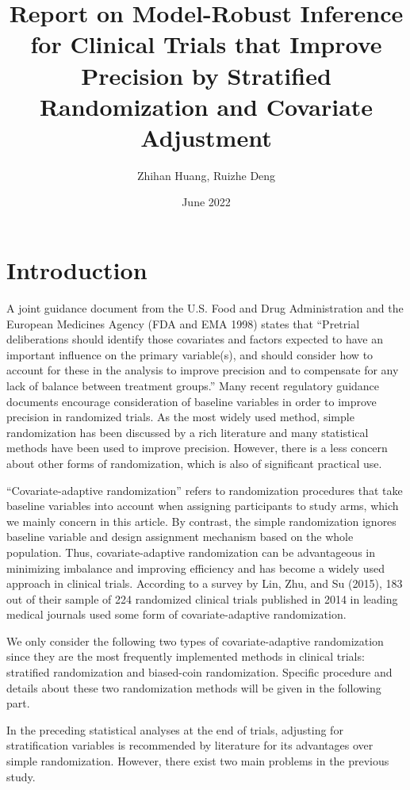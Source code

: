 \documentclass{article}
\title{Report on Model-Robust Inference for Clinical Trials that Improve Precision by Stratified Randomization and Covariate Adjustment}
\author{Zhihan Huang, Ruizhe Deng}
\date{June 2022}
\begin{document}
\maketitle

\section{Introduction}
A joint guidance document from the U.S. Food and Drug
Administration and the European Medicines Agency (FDA and
EMA 1998\cite{fda1998e9}) states that “Pretrial deliberations should identify those covariates and factors expected to have an important influence on the primary variable(s), and should consider how to account for these in the analysis to improve precision and to compensate for any lack of balance between treatment groups.” 
Many recent regulatory guidance documents encourage consideration of baseline variables in order to improve precision in randomized trials. 
As the most widely used method, simple randomization has been discussed by a rich literature and many statistical methods have been used to improve precision. However, there is a less concern about other forms of randomization, which is also of significant practical use.

“Covariate-adaptive randomization” refers to randomization
procedures that take baseline variables into account when
assigning participants to study arms, which we mainly concern in this article. By contrast, the simple randomization ignores baseline variable and design assignment mechanism based on the whole population.
Thus, covariate-adaptive randomization can be advantageous in minimizing imbalance and improving efficiency and has become a widely used approach in clinical trials.
According to a survey by Lin, Zhu, and Su (2015)\cite{lin2015pursuit}, 183 out of their sample of 224 randomized clinical trials published in 2014 in leading medical journals used some form of covariate-adaptive randomization.

We only consider the following two types of covariate-adaptive randomization since they are the most frequently implemented methods in clinical trials: stratified randomization and biased-coin randomization.
Specific procedure and details about these two randomization methods will be given in the following part.

In the preceding statistical analyses at the end of trials, adjusting for stratification variables is recommended by literature for its advantages over simple randomization.
However, there exist two main problems in the previous study.
\end{document}
